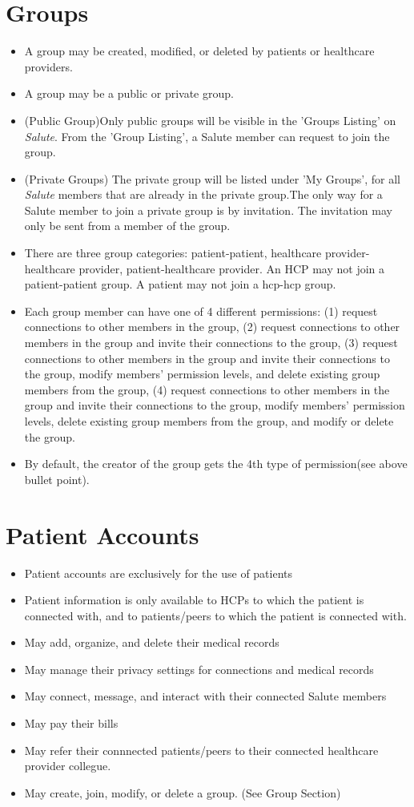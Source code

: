 \section{Groups}
\begin{itemize}
\item A group may be created, modified, or deleted by patients or healthcare providers.
\item A group may be a public or private group. 
\item (Public Group)Only public groups will be visible in the 'Groups Listing' on \emph{Salute}. From the 'Group Listing', a Salute member can request to join the group.
\item (Private Groups) The private group will be listed under 'My Groups', for all \emph{Salute} members that are already in the private group.The only way for a Salute member to join a private group is by invitation. The invitation may only be sent from a member of the group.
\item There are three group categories: patient-patient, healthcare provider-healthcare provider, patient-healthcare provider. An HCP may not join a patient-patient group. A patient may not join a hcp-hcp group. 
\item Each group member can have one of 4 different permissions: (1) request connections to other members in the group, (2) request connections to other members in the group and invite their connections to the group, (3) request connections to other members in the group and invite their connections to the group, modify members' permission levels, and delete existing group members from the group, (4) request connections to other members in the group and invite their connections to the group,  modify members' permission levels, delete existing group members from the group, and modify or delete the group.
\item By default, the creator of the group gets the 4th type of permission(see above bullet point). 
\end{itemize} 

\section{Patient Accounts}
\begin{itemize}
\item Patient accounts are exclusively for the use of patients
\item Patient information is only available to HCPs to which the patient is connected with, and to patients/peers to which the patient is connected with.
\item May add, organize, and delete their medical records
\item May manage their privacy settings for connections and medical records
\item May connect, message, and interact with their connected Salute members
\item May pay their bills 
\item May refer their connnected patients/peers to their connected healthcare provider collegue.
\item May create, join, modify, or delete a group. (See Group Section)
\end{itemize}

